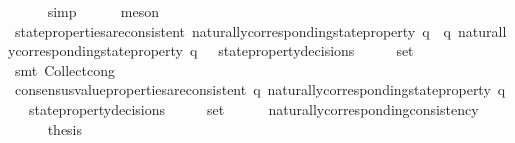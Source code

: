 \begin{isabellebody}
\ \ \ \ \isamarkupfalse%
\ simp\isanewline
\ \ \ \ \isamarkupfalse%
\ meson\ \isanewline
\ \ \isamarkupfalse%
\ {\isachardoublequoteopen}state{\isacharunderscore}properties{\isacharunderscore}are{\isacharunderscore}consistent\ {\isacharbraceleft}naturally{\isacharunderscore}corresponding{\isacharunderscore}state{\isacharunderscore}property\ q\ {\isacharbar}\ q{\isachardot}\ naturally{\isacharunderscore}corresponding{\isacharunderscore}state{\isacharunderscore}property\ q\ {\isasymin}\ {\isasymUnion}\ {\isacharbraceleft}state{\isacharunderscore}property{\isacharunderscore}decisions\ {\isasymsigma}\ {\isacharbar}\ {\isasymsigma}{\isachardot}\ {\isasymsigma}\ {\isasymin}\ {\isasymsigma}{\isacharunderscore}set{\isacharbraceright}{\isacharbraceright}{\isachardoublequoteclose}\isanewline
\ \ \ \ \isamarkupfalse%
\ {\isacharparenleft}smt\ Collect{\isacharunderscore}cong{\isacharparenright}\isanewline
\ \ \isamarkupfalse%
\ {\isachardoublequoteopen}consensus{\isacharunderscore}value{\isacharunderscore}properties{\isacharunderscore}are{\isacharunderscore}consistent\ {\isacharbraceleft}q{\isachardot}\ naturally{\isacharunderscore}corresponding{\isacharunderscore}state{\isacharunderscore}property\ q\ {\isasymin}\ {\isasymUnion}\ {\isacharbraceleft}state{\isacharunderscore}property{\isacharunderscore}decisions\ {\isasymsigma}\ {\isacharbar}\ {\isasymsigma}{\isachardot}\ {\isasymsigma}\ {\isasymin}\ {\isasymsigma}{\isacharunderscore}set{\isacharbraceright}{\isacharbraceright}{\isachardoublequoteclose}\isanewline
\ \ \ \ \isamarkupfalse%
\ naturally{\isacharunderscore}corresponding{\isacharunderscore}consistency\isanewline
\ \ \isamarkupfalse%
\ {\isacharminus}\isanewline
\ \ \ \ \isamarkupfalse%
\ {\isacharquery}thesis\isanewline
\ \ \ \ \ \ \isamarkupfalse%

\end{isabellebody}

